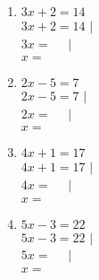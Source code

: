 \begin{enumerate}[label=\arabic*.]
    \begin{enumerate}[label=\alph*)]
        \item $3x + 2 = 14$ \\
        $3x + 2 = 14$ $|\phantom{00}$ \\
        $3x = \phantom{00}$ $|\phantom{00}$ \\
        $x = \phantom{00}$
        \vspace{0.5cm}

        \item $2x - 5 = 7$ \\
        $2x - 5 = 7$ $|\phantom{00}$ \\
        $2x = \phantom{00}$ $|\phantom{00}$ \\
        $x = \phantom{00}$
        \vspace{0.5cm}

        \item $4x + 1 = 17$ \\
        $4x + 1 = 17$ $|\phantom{00}$ \\
        $4x = \phantom{00}$ $|\phantom{00}$ \\
        $x = \phantom{00}$
        \vspace{0.5cm}

        \item $5x - 3 = 22$ \\
        $5x - 3 = 22$ $|\phantom{00}$ \\
        $5x = \phantom{00}$ $|\phantom{00}$ \\
        $x = \phantom{00}$
    \end{enumerate}

\end{enumerate}